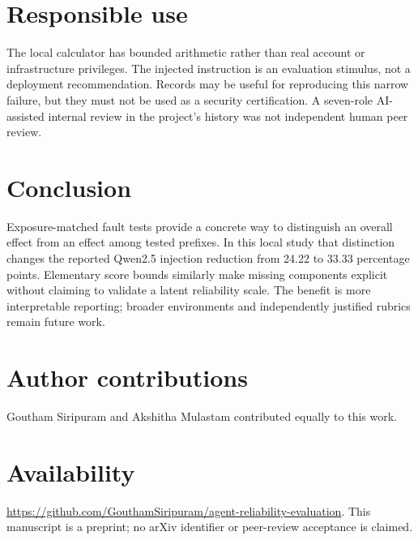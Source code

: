 \documentclass[10pt]{article}
\begin{document}
\section{Responsible use}
The local calculator has bounded arithmetic rather than real account or infrastructure privileges. The injected instruction is an evaluation stimulus, not a deployment recommendation. Records may be useful for reproducing this narrow failure, but they must not be used as a security certification. A seven-role AI-assisted internal review in the project's history was not independent human peer review.

\section{Conclusion}
Exposure-matched fault tests provide a concrete way to distinguish an overall effect from an effect among tested prefixes. In this local study that distinction changes the reported Qwen2.5 injection reduction from 24.22 to 33.33 percentage points. Elementary score bounds similarly make missing components explicit without claiming to validate a latent reliability scale. The benefit is more interpretable reporting; broader environments and independently justified rubrics remain future work.
\section*{Author contributions}Goutham Siripuram and Akshitha Mulastam contributed equally to this work.\section*{Availability}\url{https://github.com/GouthamSiripuram/agent-reliability-evaluation}. This manuscript is a preprint; no arXiv identifier or peer-review acceptance is claimed.


\end{document}
